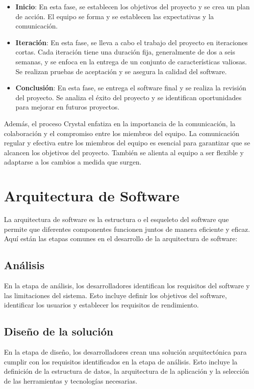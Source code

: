 \documentclass[executivepaper]{article}
\begin{document}
\begin{itemize}
\item \textbf{Inicio}: En esta fase, se establecen los objetivos del proyecto y se crea un plan de acción. El equipo se forma y se establecen las expectativas y la comunicación.
\item \textbf{Iteración}: En esta fase, se lleva a cabo el trabajo del proyecto en iteraciones cortas. Cada iteración tiene una duración fija, generalmente de dos a seis semanas, y se enfoca en la entrega de un conjunto de características valiosas. Se realizan pruebas de aceptación y se asegura la calidad del software.
\item \textbf{Conclusión}: En esta fase, se entrega el software final y se realiza la revisión del proyecto. Se analiza el éxito del proyecto y se identifican oportunidades para mejorar en futuros proyectos.
\end{itemize}

Además, el proceso Crystal enfatiza en la importancia de la comunicación, la colaboración y el compromiso entre los miembros del equipo. La comunicación regular y efectiva entre los miembros del equipo es esencial para garantizar que se alcancen los objetivos del proyecto. También se alienta al equipo a ser flexible y adaptarse a los cambios a medida que surgen.

\newpage
\section{Arquitectura de Software}
La arquitectura de software es la estructura o el esqueleto del software que permite que diferentes componentes funcionen juntos de manera eficiente y eficaz. Aquí están las etapas comunes en el desarrollo de la arquitectura de software:

\subsection*{Análisis}
En la etapa de análisis, los desarrolladores identifican los requisitos del software y las limitaciones del sistema. Esto incluye definir los objetivos del software, identificar los usuarios y establecer los requisitos de rendimiento.

\subsection*{Diseño de la solución}
En la etapa de diseño, los desarrolladores crean una solución arquitectónica para cumplir con los requisitos identificados en la etapa de análisis. Esto incluye la definición de la estructura de datos, la arquitectura de la aplicación y la selección de las herramientas y tecnologías necesarias.
\end{document}
